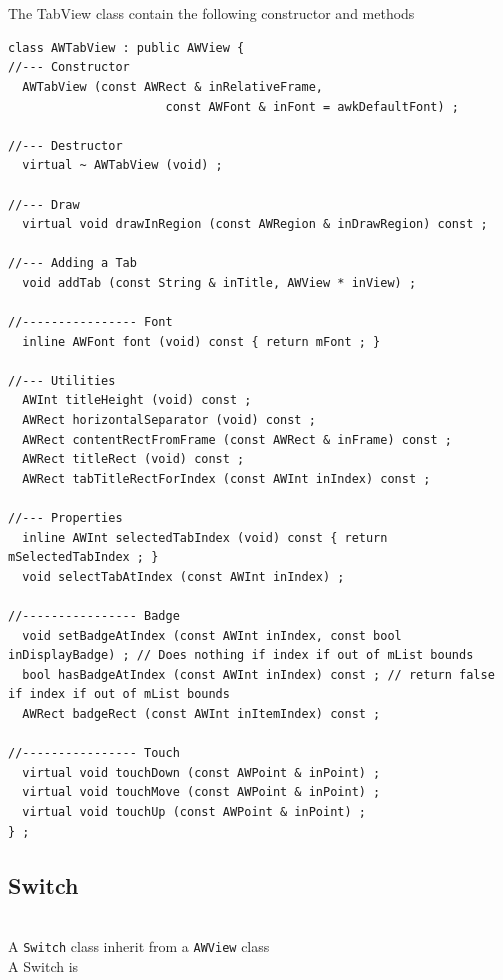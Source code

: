 \documentclass[a4paper,11pt]{extarticle}
\begin{document}
~\\

~\\ The TabView class contain the following constructor and methods

\begin{lstlisting}[language=Arduinonl]
class AWTabView : public AWView {
//--- Constructor
  AWTabView (const AWRect & inRelativeFrame,
                      const AWFont & inFont = awkDefaultFont) ;

//--- Destructor
  virtual ~ AWTabView (void) ;

//--- Draw
  virtual void drawInRegion (const AWRegion & inDrawRegion) const ;

//--- Adding a Tab
  void addTab (const String & inTitle, AWView * inView) ;

//---------------- Font
  inline AWFont font (void) const { return mFont ; }

//--- Utilities
  AWInt titleHeight (void) const ;
  AWRect horizontalSeparator (void) const ;
  AWRect contentRectFromFrame (const AWRect & inFrame) const ;
  AWRect titleRect (void) const ;
  AWRect tabTitleRectForIndex (const AWInt inIndex) const ;

//--- Properties
  inline AWInt selectedTabIndex (void) const { return mSelectedTabIndex ; }
  void selectTabAtIndex (const AWInt inIndex) ;

//---------------- Badge
  void setBadgeAtIndex (const AWInt inIndex, const bool inDisplayBadge) ; // Does nothing if index if out of mList bounds
  bool hasBadgeAtIndex (const AWInt inIndex) const ; // return false if index if out of mList bounds
  AWRect badgeRect (const AWInt inItemIndex) const ;

//---------------- Touch
  virtual void touchDown (const AWPoint & inPoint) ;
  virtual void touchMove (const AWPoint & inPoint) ;
  virtual void touchUp (const AWPoint & inPoint) ;
} ;
\end{lstlisting}


\newpage
\subsection{Switch}

~\\ A \texttt{Switch} class inherit from a \texttt{AWView} class
~\\ A Switch is 
~\\
~\\
\end{document}
